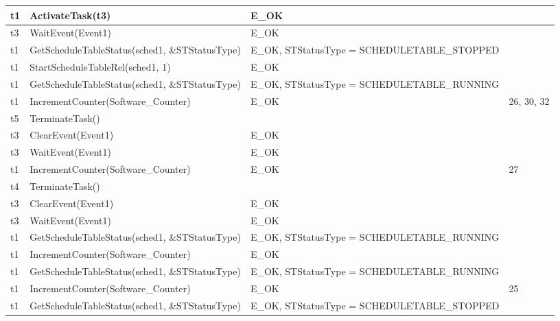 \documentclass[10pt]{article}
\newlength{\Li}\settowidth{\Li}{Running}
\newlength{\Lii}\setlength{\Lii}{7cm}
\newlength{\Liiii}\setlength{\Liiii}{0.9cm}
\newlength{\Liii}\setlength{\Liii}{\textwidth} \addtolength{\Liii}{-\Li} \addtolength{\Liii}{-\Lii} \addtolength{\Liii}{-\Liiii}
\begin{document}
	\begin{supertabular}{|p{\Li}|p{\Lii}|p{\Liii}|p{\Liiii}|} \hline 
	t1	& ActivateTask(t3)														& E\_OK												& \\ \hline
	
	t3	& WaitEvent(Event1)														& E\_OK												& \\ \hline
	
	t1	& GetScheduleTableStatus(sched1, \&STStatusType)							& E\_OK, STStatusType = SCHEDULETABLE\_STOPPED		& \\ \hline
	t1	& StartScheduleTableRel(sched1, 1)										& E\_OK												& \\ \hline
	t1	& GetScheduleTableStatus(sched1, \&STStatusType)							& E\_OK, STStatusType = SCHEDULETABLE\_RUNNING		& \\ \hline
	t1	& IncrementCounter(Software\_Counter)										& E\_OK												& 26, 30, 32 \\ \hline
	
	t5	& TerminateTask()														& 													& \\ \hline
	
	t3	& ClearEvent(Event1)													& E\_OK												& \\ \hline
	t3	& WaitEvent(Event1)														& E\_OK												& \\ \hline
		
	t1	& IncrementCounter(Software\_Counter)										& E\_OK												& 27 \\ \hline

	t4	& TerminateTask()														& 													& \\ \hline
	
	t3	& ClearEvent(Event1)													& E\_OK												& \\ \hline
	t3	& WaitEvent(Event1)														& E\_OK												& \\ \hline

	t1	& GetScheduleTableStatus(sched1, \&STStatusType)							& E\_OK, STStatusType = SCHEDULETABLE\_RUNNING		& \\ \hline
	t1	& IncrementCounter(Software\_Counter)										& E\_OK												& \\ \hline
	t1	& GetScheduleTableStatus(sched1, \&STStatusType)							& E\_OK, STStatusType = SCHEDULETABLE\_RUNNING		& \\ \hline
	t1	& IncrementCounter(Software\_Counter)										& E\_OK												& 25 \\ \hline
	t1	& GetScheduleTableStatus(sched1, \&STStatusType)							& E\_OK, STStatusType = SCHEDULETABLE\_STOPPED		& \\ \hline


\end{supertabular}
\end{document}
